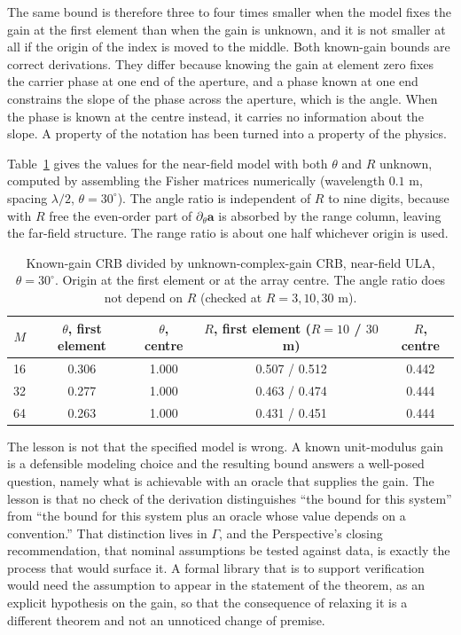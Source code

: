 \documentclass[11pt]{article}
\theoremstyle{definition}
\begin{document}
The same bound is therefore three to four times smaller when the model fixes the gain at the first element than when the gain is unknown, and it is not smaller at all if the origin of the index is moved to the middle. Both known-gain bounds are correct derivations. They differ because knowing the gain at element zero fixes the carrier phase at one end of the aperture, and a phase known at one end constrains the slope of the phase across the aperture, which is the angle. When the phase is known at the centre instead, it carries no information about the slope. A property of the notation has been turned into a property of the physics.

Table~\ref{tab:crb} gives the values for the near-field model with both $\theta$ and $R$ unknown, computed by assembling the Fisher matrices numerically (wavelength $0.1$ m, spacing $\lambda/2$, $\theta=30^\circ$). The angle ratio is independent of $R$ to nine digits, because with $R$ free the even-order part of $\partial_\theta\mathbf a$ is absorbed by the range column, leaving the far-field structure. The range ratio is about one half whichever origin is used.

\begin{table}[h]
\centering
\caption{Known-gain CRB divided by unknown-complex-gain CRB, near-field ULA, $\theta=30^\circ$. Origin at the first element or at the array centre. The angle ratio does not depend on $R$ (checked at $R=3,10,30$ m).}
\label{tab:crb}
\begin{tabular}{rcccc}
\toprule
$M$ & $\theta$, first element & $\theta$, centre & $R$, first element ($R=10$ / $30$ m) & $R$, centre \\
\midrule
16 & 0.306 & 1.000 & 0.507 / 0.512 & 0.442 \\
32 & 0.277 & 1.000 & 0.463 / 0.474 & 0.444 \\
64 & 0.263 & 1.000 & 0.431 / 0.451 & 0.444 \\
\bottomrule
\end{tabular}
\end{table}

The lesson is not that the specified model is wrong. A known unit-modulus gain is a defensible modeling choice and the resulting bound answers a well-posed question, namely what is achievable with an oracle that supplies the gain. The lesson is that no check of the derivation distinguishes ``the bound for this system'' from ``the bound for this system plus an oracle whose value depends on a convention.'' That distinction lives in $\Gamma$, and the Perspective's closing recommendation, that nominal assumptions be tested against data, is exactly the process that would surface it. A formal library that is to support verification would need the assumption to appear in the statement of the theorem, as an explicit hypothesis on the gain, so that the consequence of relaxing it is a different theorem and not an unnoticed change of premise.
\end{document}
